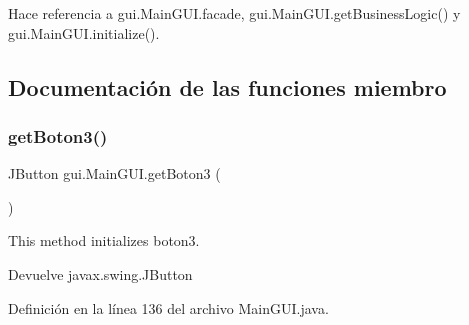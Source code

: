 Hace referencia a gui.\+Main\+G\+U\+I.\+facade, gui.\+Main\+G\+U\+I.\+get\+Business\+Logic() y gui.\+Main\+G\+U\+I.\+initialize().



\subsection{Documentación de las funciones miembro}
\mbox{\label{classgui_1_1_main_g_u_i_a57ef624d5e53ea6591fdf4dfc776b399}} 
\subsubsection{\texorpdfstring{getBoton3()}{getBoton3()}}
{\footnotesize\ttfamily J\+Button gui.\+Main\+G\+U\+I.\+get\+Boton3 (\begin{DoxyParamCaption}{ }\end{DoxyParamCaption})\hspace{0.3cm}{\ttfamily [private]}}



This method initializes boton3. 

\begin{DoxyReturn}{Devuelve}
javax.\+swing.\+J\+Button 
\end{DoxyReturn}


Definición en la línea 136 del archivo Main\+G\+U\+I.\+java.


